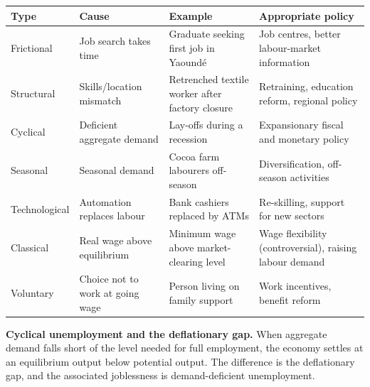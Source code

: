 \documentclass[11pt]{article}
\newcommand{\cle}[1]{{\popxbold\color{popdark}#1}}
\begin{document}
\begin{center}
\begin{tabularx}{\linewidth}{|l|X|X|X|}
\hline
\rowcolor{popblueL} \textbf{Type} & \textbf{Cause} & \textbf{Example} & \textbf{Appropriate policy} \\
\hline
Frictional & Job search takes time & Graduate seeking first job in Yaoundé & Job centres, better labour-market information \\
\hline
Structural & Skills/location mismatch & Retrenched textile worker after factory closure & Retraining, education reform, regional policy \\
\hline
Cyclical & Deficient aggregate demand & Lay-offs during a recession & Expansionary fiscal and monetary policy \\
\hline
Seasonal & Seasonal demand & Cocoa farm labourers off-season & Diversification, off-season activities \\
\hline
Technological & Automation replaces labour & Bank cashiers replaced by ATMs & Re-skilling, support for new sectors \\
\hline
Classical & Real wage above equilibrium & Minimum wage above market-clearing level & Wage flexibility (controversial), raising labour demand \\
\hline
Voluntary & Choice not to work at going wage & Person living on family support & Work incentives, benefit reform \\
\hline
\end{tabularx}
\end{center}

\textbf{Cyclical unemployment and the deflationary gap.} When aggregate demand falls short of the level needed for full employment, the economy settles at an equilibrium output below potential output. The difference is the \cle{deflationary gap}, and the associated joblessness is demand-deficient unemployment.
\end{document}
